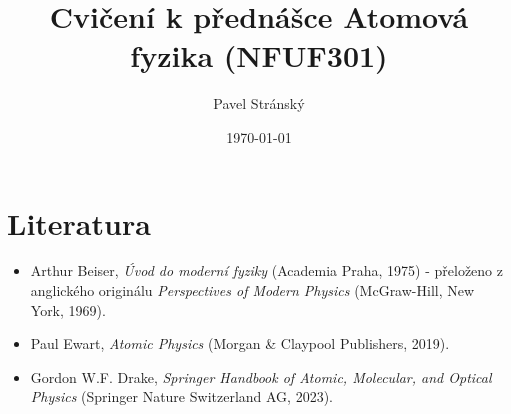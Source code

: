 \documentclass[a4paper,11pt,twoside]{article}
\newcommand{\np}{\clearpage\newpage}
\begin{document}
\makeatletter
{}
\renewcommand{\theequation}{\arabic{section}.\arabic{subsection}.\arabic{equation}}
\makeatother

\title{Cvičení k přednášce Atomová fyzika (NFUF301)}
\date{\today}
\author{Pavel Stránský}

\maketitle
{}
\tableofcontents\np

\section*{Literatura}
\begin{itemize}
	\item Arthur Beiser, {\it Úvod do moderní fyziky} (Academia Praha, 1975) - přeloženo z anglického originálu {\it Perspectives of Modern Physics} (McGraw-Hill, New York, 1969).
	
	\item Paul Ewart, {\it Atomic Physics} (Morgan \& Claypool Publishers, 2019).
	
	\item Gordon W.F. Drake, {\it Springer Handbook of Atomic, Molecular, and Optical Physics} (Springer Nature Switzerland AG, 2023).
\end{itemize}

\np
\np
\np
\np
\np
\np
\np
\np
\np
\np

\printindex

%
\printbibliography
%
\end{document}
